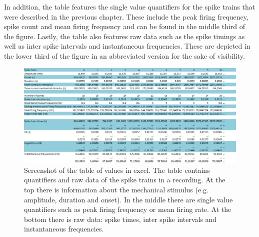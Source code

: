 In addition, the table features the single value quantifiers for the spike trains that were described in the previous chapter. These include the peak firing frequency, spike count and mean firing frequency and can be found in the middle third of the figure.
Lastly, the table also features raw data such as the spike timings as well as inter spike intervals and instantaneous frequencies. These are depicted in the lower third of the figure in an abbreviated version for the sake of visibility.
\begin{figure}
	\includegraphics[width = \textwidth]{src/pic/11_12_13_screenshot_for_overview}
	\caption{Screenshot of the table of values in excel. The table contains quantifiers and raw data of the spike trains in a recording. At the top there is information about the mechanical stimulus (e.g. amplitude, duration and onset). In the middle there are single value quantifiers such as peak firing frequency or mean firing rate. At the bottom there is raw data: spike times, inter spike intervals and instantaneous frequencies.}
	\label{fig:table_sc}
\end{figure}

